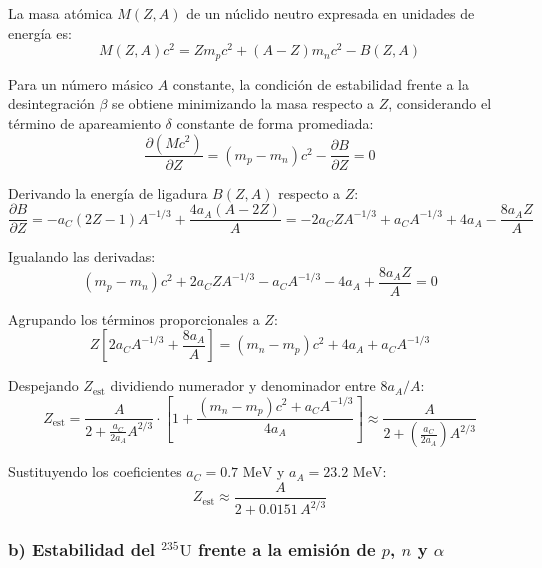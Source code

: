 \begin{problema}
La masa atómica $M(Z,A)$ de un núclido neutro expresada en unidades de energía es:
\begin{equation}
M(Z,A) c^2 = Z m_p c^2 + (A-Z) m_n c^2 - B(Z,A)
\end{equation}

Para un número másico $A$ constante, la condición de estabilidad frente a la desintegración $\beta$ se obtiene minimizando la masa respecto a $Z$, considerando el término de apareamiento $\delta$ constante de forma promediada:
\begin{equation}
\frac{\partial (M c^2)}{\partial Z} = (m_p - m_n)c^2 - \frac{\partial B}{\partial Z} = 0
\end{equation}

Derivando la energía de ligadura $B(Z,A)$ respecto a $Z$:
\begin{equation}
\frac{\partial B}{\partial Z} = -a_C (2Z - 1) A^{-1/3} + \frac{4 a_A (A - 2Z)}{A} = -2 a_C Z A^{-1/3} + a_C A^{-1/3} + 4 a_A - \frac{8 a_A Z}{A}
\end{equation}

Igualando las derivadas:
\begin{equation}
(m_p - m_n)c^2 + 2 a_C Z A^{-1/3} - a_C A^{-1/3} - 4 a_A + \frac{8 a_A Z}{A} = 0
\end{equation}

Agrupando los términos proporcionales a $Z$:
\begin{equation}
Z \left[ 2 a_C A^{-1/3} + \frac{8 a_A}{A} \right] = (m_n - m_p)c^2 + 4 a_A + a_C A^{-1/3}
\end{equation}

Despejando $Z_{\text{est}}$ dividiendo numerador y denominador entre $8 a_A / A$:
\begin{equation}
Z_{\text{est}} = \frac{A}{2 + \frac{a_C}{2 a_A} A^{2/3}} \cdot \left[ 1 + \frac{(m_n - m_p)c^2 + a_C A^{-1/3}}{4 a_A} \right] \approx \frac{A}{2 + \left(\frac{a_C}{2 a_A}\right) A^{2/3}}
\end{equation}

Sustituyendo los coeficientes $a_C = 0.7\text{ MeV}$ y $a_A = 23.2\text{ MeV}$:
\begin{equation}
Z_{\text{est}} \approx \frac{A}{2 + 0.0151 \, A^{2/3}}
\end{equation}

\subsubsection*{b) Estabilidad del ${}^{235}\text{U}$ frente a la emisión de $p$, $n$ y $\alpha$}


\end{problema}
